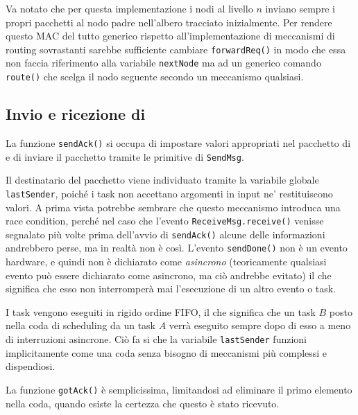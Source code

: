 \documentclass[twoside,11pt,a4paper,italian,openany]{book}
\begin{document}
Va notato che per questa implementazione i nodi al livello $n$ inviano sempre i propri 
pacchetti al nodo padre nell'albero tracciato inizialmente. 
Per rendere questo MAC del tutto generico rispetto all'implementazione di meccanismi di 
routing sovrastanti sarebbe sufficiente cambiare \texttt{forwardReq()} in modo che essa 
non faccia riferimento alla variabile  \texttt{nextNode} ma ad un generico comando 
\texttt{route()} che scelga il nodo seguente secondo un meccanismo qualsiasi.  

\subsection{Invio e ricezione di \ack}
La funzione \texttt{sendAck()} si occupa di impostare valori appropriati nel pacchetto di \ack 
e di inviare il pacchetto tramite le primitive di \texttt{SendMsg}. 

Il destinatario del pacchetto \ack viene individuato tramite la variabile 
globale \texttt{lastSender}, poiché i task non accettano argomenti in input ne' 
restituiscono valori. 
A prima vista potrebbe sembrare che questo meccanismo introduca una race condition, perché nel caso che l'evento \texttt{ReceiveMsg.receive()} venisse segnalato più volte prima dell'avvio 
di \texttt{sendAck()} alcune delle informazioni andrebbero perse,
ma in realtà non è così. L'evento \texttt{sendDone()} non è un evento hardware, e quindi non 
è dichiarato come \emph{asincrono} (teoricamente qualsiasi evento può essere dichiarato come 
asincrono, ma ciò andrebbe evitato)
 il che significa che esso non interromperà mai l'esecuzione di un altro evento o task. 

I task vengono eseguiti in rigido ordine FIFO, il che significa che un task $B$ posto nella coda
di scheduling da un task $A$ verrà eseguito sempre dopo di esso a meno di interruzioni asincrone.
Ciò fa si che la variabile \texttt{lastSender} funzioni implicitamente come una coda senza 
bisogno di meccanismi più complessi e dispendiosi. 

La funzione \texttt{gotAck()} è semplicissima, limitandosi ad eliminare il primo elemento 
nella coda, quando esiste la certezza che questo è stato ricevuto. 
\end{document}
